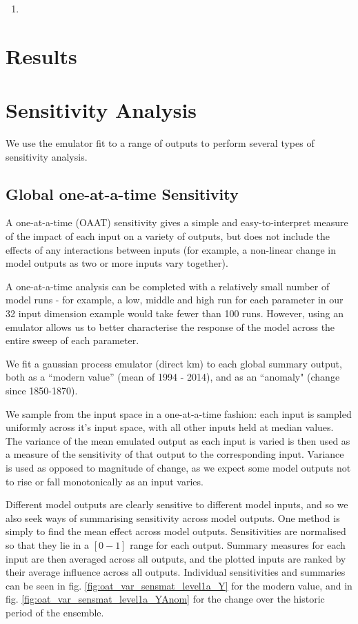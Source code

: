 \documentclass[gmd, manuscript]{copernicus}
\begin{document}
\begin{enumerate}
    \item 
\end{enumerate}



\section{Results}



\section{Sensitivity Analysis}
We use the emulator fit to a range of outputs to perform several types of sensitivity analysis.

\subsection{Global one-at-a-time Sensitivity}

A one-at-a-time (OAAT) sensitivity gives a simple and easy-to-interpret measure of the impact of each input on a variety of outputs, but does not include the effects of any interactions between inputs (for example, a non-linear change in model outputs as two or more inputs vary together).  

A one-at-a-time analysis can be completed with a relatively small number of model runs - for example, a low, middle and high run for each parameter in our 32 input dimension example would take fewer than 100 runs. However, using an emulator allows us to better characterise the response of the model across the entire sweep of each parameter.

We fit a gaussian process emulator (direct km) to each global summary output, both as a ``modern value'' (mean of 1994 - 2014), and as an ``anomaly" (change since 1850-1870).

We sample from the input space in a one-at-a-time fashion: each input is sampled uniformly across it's input space, with all other inputs held at median values. The variance of the mean emulated output as each input is varied is then used as a measure of the sensitivity of that output to the corresponding input. Variance is used as opposed to magnitude of change, as we expect some model outputs not to rise or fall monotonically as an input varies.

Different model outputs are clearly sensitive to different model inputs, and so we also seek ways of summarising sensitivity across model outputs. One method is simply to find the mean effect across model outputs. Sensitivities are normalised so that they lie in a $[0 -1]$ range for each output. Summary measures for each input are then averaged across all outputs, and the plotted inputs are ranked by their average influence across all outputs. Individual sensitivities and summaries can be seen in fig. \ref{fig:oat_var_sensmat_level1a_Y} for the modern value, and in fig. \ref{fig:oat_var_sensmat_level1a_YAnom} for the change over the historic period of the ensemble. 
\end{document}
